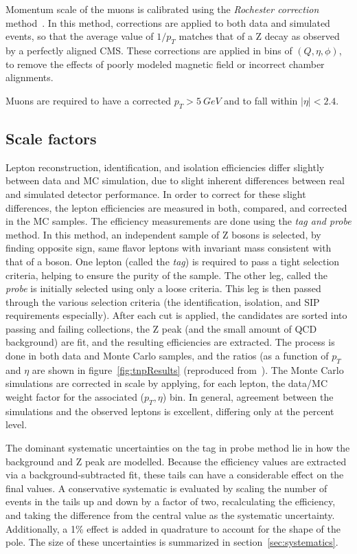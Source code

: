 Momentum scale of the muons is calibrated using the \emph{Rochester correction}
method~\cite{rochester}. In this method, corrections are applied to both data
and simulated events, so that the average value of $1/p_{T}$ matches that of a Z
decay as observed by a perfectly aligned CMS. These corrections are applied in
bins of $(Q, \eta, \phi)$, to remove the effects of poorly modeled magnetic
field or incorrect chamber alignments.

Muons are required to have a corrected $p_T >5~GeV$ and to fall within
$|\eta|<2.4$.

\subsection{Scale factors}
\label{sub:scale_factors}
Lepton reconstruction, identification, and isolation efficiencies differ
slightly between data and MC simulation, due to slight inherent differences
between real and simulated detector performance. In order to correct for these
slight differences, the lepton efficiencies are measured in both, compared, and
corrected in the MC samples. The efficiency measurements are done using the
\emph{tag and probe} method. In this method, an independent sample of
Z bosons is selected, by finding opposite sign, same flavor leptons with
invariant mass consistent with that of a  \Z boson. One lepton (called the
\emph{tag}) is required to pass a tight selection criteria, helping to ensure
the purity of the \Z sample. The other leg, called the \emph{probe} is initially
selected using only a loose criteria. This leg is then passed through the
various selection criteria (the identification, isolation, and SIP requirements
especially). After each cut is applied, the candidates are sorted into passing
and failing collections, the Z peak (and the small amount of QCD background) are
fit, and the resulting efficiencies are extracted. The process is done in both
data and Monte Carlo samples, and the ratios (as a function of $p_T$ and
$\eta$ are shown in figure~\ref{fig:tnpResults} (reproduced
from~\cite{zzAN}).  The Monte Carlo simulations are corrected in scale
by applying, for each lepton, the data/MC weight factor for the associated
($p_T, \eta$) bin.  In general, agreement between the simulations and the
observed leptons is excellent, differing only at the percent level. 

The dominant systematic uncertainties on the tag in probe method lie in how the
background and Z peak are modelled. Because the efficiency values
are extracted via a background-subtracted fit, these tails can have a
considerable effect on the final values. A conservative systematic is evaluated
by scaling the number of events in the tails up and down by a factor of two, 
recalculating the efficiency, and taking the difference from the central value
as the systematic uncertainty. Additionally, a 1\% effect is added in quadrature
to account for the shape of the \Z pole. The size of these uncertainties is
summarized in section~\ref{sec:systematics}.

